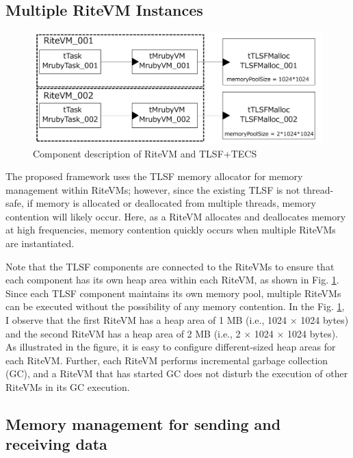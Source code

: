 \documentclass[a4j,12pt,oneside,openany,english]{jsbook}
\begin{document}
\subsection*{Multiple RiteVM Instances}

\begin{figure}[t]
    \centering
    \includegraphics[width=12cm,clip]{figure/UseCase_mruby.pdf}
    \caption{Component description of RiteVM and TLSF+TECS}
    \label{fig:UseCase_mruby}
\end{figure}

The proposed framework uses the TLSF memory allocator for memory management within RiteVMs; however, since the existing TLSF is not thread-safe, if memory is allocated or deallocated from multiple threads, memory contention will likely occur.
Here, as a RiteVM allocates and deallocates memory at high frequencies, memory contention quickly occurs when multiple RiteVMs are instantiated.

Note that the TLSF components are connected to the RiteVMs to ensure that each component has its own heap area within each RiteVM, as shown in Fig. \ref{fig:UseCase_mruby}.
Since each TLSF component maintains its own memory pool, multiple RiteVMs can be executed without the possibility of any memory contention.
In the Fig. \ref{fig:UseCase_mruby}, I observe that the first RiteVM has a heap area of 1 MB (i.e., 1024 $\times$ 1024 bytes) and the second RiteVM has a heap area of 2 MB (i.e., 2 $\times$ 1024 $\times$ 1024 bytes).
As illustrated in the figure, it is easy to configure different-sized heap areas for each RiteVM.
Further, each RiteVM performs incremental garbage collection (GC), and a RiteVM that has started GC does not disturb the execution of other RiteVMs in its GC execution.
    
\subsection*{Memory management for sending and receiving data}
\end{document}
